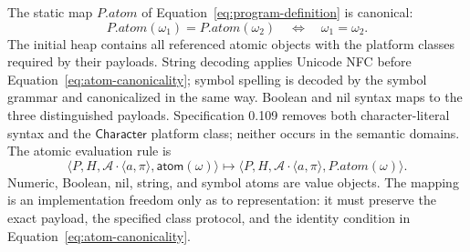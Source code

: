 \documentclass[11pt]{article}
\numberwithin{equation}{section}
\newcommand{\kw}[1]{\ensuremath{\mathsf{#1}}}
\begin{document}
The static map $P.\mathit{atom}$ of
Equation~\eqref{eq:program-definition} is canonical:
\begin{equation}\label{eq:atom-canonicality}
 P.\mathit{atom}(\omega_1)=P.\mathit{atom}(\omega_2)
 \quad\Longleftrightarrow\quad \omega_1=\omega_2.
\end{equation}
The initial heap contains all referenced atomic objects with the platform
classes required by their payloads.  String decoding applies Unicode NFC
before Equation~\eqref{eq:atom-canonicality}; symbol spelling is decoded by
the symbol grammar and canonicalized in the same way.  Boolean and nil syntax
maps to the three distinguished payloads.  Specification 0.109 removes both
character-literal syntax and the \kw{Character} platform class; neither occurs
in the semantic domains.  The atomic evaluation rule is
\[
 \langle P,H,\mathcal A\cdot\langle a,\pi\rangle,
          \kw{atom}(\omega)\rangle
 \longmapsto
 \langle P,H,\mathcal A\cdot\langle a,\pi\rangle,
          P.\mathit{atom}(\omega)\rangle.
 \tag{Atom}
\]
Numeric, Boolean, nil, string, and symbol atoms are value objects.
The mapping is an implementation freedom only as to representation: it must
preserve the exact payload, the specified class protocol, and the identity
condition in Equation~\eqref{eq:atom-canonicality}.
\end{document}
